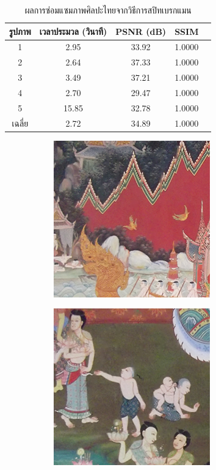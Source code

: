 \documentclass[hidelinks, a4paper,12pt]{article}
\numberwithin{equation}{section}							%
\numberwithin{equation}{section}
\begin{document}
{\begin{table}[H]
\begin{tabular}[ht]{|c|c|c|c|c|}
			\hline
			รูปภาพ &เวลาประมวล  (วินาที) & PSNR (dB) & SSIM \\
			\hline
			1 & 2.95 & 33.92 & 1.0000 \\ 
			2 & 2.64 & 37.33 & 1.0000 \\
			3 &  3.49 & 37.21 & 1.0000 \\
			4 & 2.70  & 29.47  & 1.0000 \\
			5 & 15.85  & 32.78  & 1.0000 \\
			\hline
			เฉลี่ย & 2.72  & 34.89  & 1.0000 \\
			\hline
		\end{tabular}
		\caption{ผลการซ่อมแซมภาพศิลปะไทยจากวิธีการสปิทเบรกแมน}
		\label{result:table-thaiart-splitbregman}
	\end{table}
	\begin{figure}[H]
		\centering
		\begin{subfigure}{0.4\linewidth}
			\centering
			\includegraphics[width=0.8\linewidth]{images/result_ex4/multisplitbergman_case01.png}
		\end{subfigure}
		\begin{subfigure}{0.4\linewidth}
			\centering
			\includegraphics[width=0.8\linewidth]{images/result_ex4/multisplitbergman_case02.png}

\end{subfigure}
\end{figure}}
\end{document}
